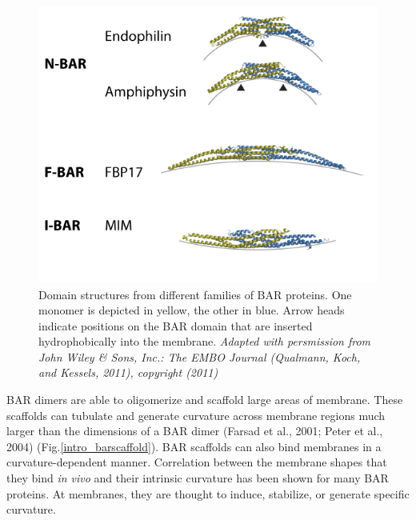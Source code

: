 \begin{figure}[H]
	\centering
	\includegraphics[scale=0.7]{figures/intro/BAR_structures}
		\caption[Structures of BAR domain dimers]{Domain structures from different families of BAR proteins. One monomer is depicted in yellow, the other in blue. Arrow heads indicate positions on the BAR domain that are inserted hydrophobically into the membrane. \textit{Adapted with persmission from John Wiley \& Sons, Inc.: The EMBO Journal (Qualmann, Koch, and Kessels, 2011), copyright (2011)}
		\label{bar_structures}}
\end{figure}

\newpage
\vspace{5mm}
BAR dimers are able to oligomerize and scaffold large areas of membrane. These scaffolds can tubulate and generate curvature across membrane regions much larger than the dimensions of a BAR dimer (Farsad et al., 2001; Peter et al., 2004) (Fig.\ref{intro_barscaffold}). BAR scaffolds can also bind membranes in a curvature-dependent manner. Correlation between the membrane shapes that they bind \textit{in vivo} and their intrinsic curvature has been shown for many BAR proteins. At membranes, they are thought to induce, stabilize, or generate specific curvature. 
	
